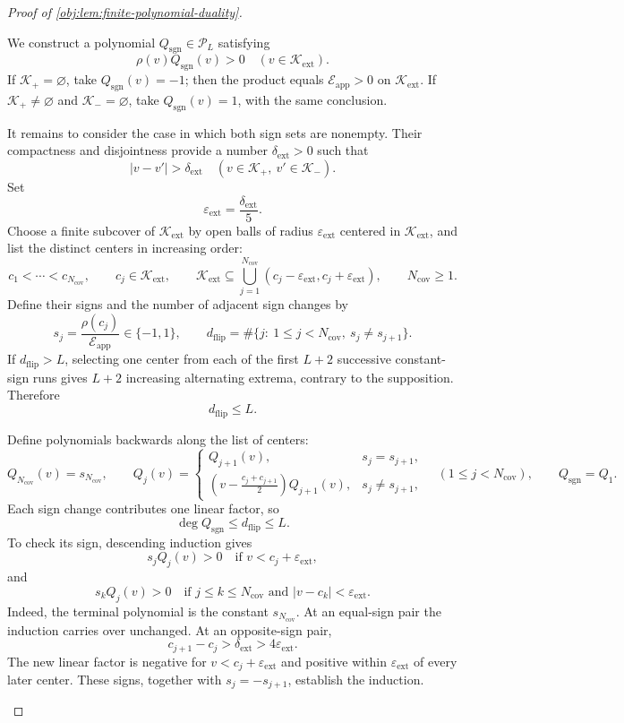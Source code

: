 \documentclass[11pt]{article}
\begin{document}
\begin{proof}[Proof of \cref{obj:lem:finite-polynomial-duality}]
\begin{enumerate}
We construct a polynomial \(Q_{\mathrm{sgn}}\in\mathscr P_L\) satisfying
\[
\rho(v)Q_{\mathrm{sgn}}(v)>0
\quad(v\in\mathcal K_{\mathrm{ext}}).
\]
If \(\mathcal K_+=\varnothing\), take \(Q_{\mathrm{sgn}}(v)=-1\); then the product equals \(\mathcal E_{\mathrm{app}}>0\) on \(\mathcal K_{\mathrm{ext}}\). If \(\mathcal K_+\ne\varnothing\) and \(\mathcal K_-=\varnothing\), take \(Q_{\mathrm{sgn}}(v)=1\), with the same conclusion.

It remains to consider the case in which both sign sets are nonempty. Their compactness and disjointness provide a number \(\delta_{\mathrm{ext}}>0\) such that
\[
|v-v'|>\delta_{\mathrm{ext}}
\quad(v\in\mathcal K_+,\ v'\in\mathcal K_-).
\]
Set
\[
\varepsilon_{\mathrm{ext}}=\frac{\delta_{\mathrm{ext}}}{5}.
\]
Choose a finite subcover of \(\mathcal K_{\mathrm{ext}}\) by open balls of radius \(\varepsilon_{\mathrm{ext}}\) centered in \(\mathcal K_{\mathrm{ext}}\), and list the distinct centers in increasing order:
\[
c_1<\cdots<c_{N_{\mathrm{cov}}},
\qquad
c_j\in\mathcal K_{\mathrm{ext}},
\qquad
\mathcal K_{\mathrm{ext}}
\subseteq
\bigcup_{j=1}^{N_{\mathrm{cov}}}
(c_j-\varepsilon_{\mathrm{ext}},c_j+\varepsilon_{\mathrm{ext}}),
\qquad
N_{\mathrm{cov}}\ge1.
\]
Define their signs and the number of adjacent sign changes by
\[
s_j=\frac{\rho(c_j)}{\mathcal E_{\mathrm{app}}}\in\{-1,1\},
\qquad
d_{\mathrm{flip}}
=
\#\{j:\ 1\le j<N_{\mathrm{cov}},\ s_j\ne s_{j+1}\}.
\]
If \(d_{\mathrm{flip}}>L\), selecting one center from each of the first \(L+2\) successive constant-sign runs gives \(L+2\) increasing alternating extrema, contrary to the supposition. Therefore
\[
d_{\mathrm{flip}}\le L.
\]

Define polynomials backwards along the list of centers:
\begingroup\footnotesize
\[
Q_{N_{\mathrm{cov}}}(v)=s_{N_{\mathrm{cov}}},
\qquad
Q_j(v)=
\begin{cases}
Q_{j+1}(v),&s_j=s_{j+1},\\[2mm]
\displaystyle
\left(v-\frac{c_j+c_{j+1}}2\right)Q_{j+1}(v),
&s_j\ne s_{j+1},
\end{cases}
\quad(1\le j<N_{\mathrm{cov}}),
\qquad
Q_{\mathrm{sgn}}=Q_1.
\]
\endgroup
Each sign change contributes one linear factor, so
\[
\deg Q_{\mathrm{sgn}}\le d_{\mathrm{flip}}\le L.
\]
To check its sign, descending induction gives
\[
s_jQ_j(v)>0
\quad\text{if }v<c_j+\varepsilon_{\mathrm{ext}},
\]
and
\[
s_kQ_j(v)>0
\quad\text{if }j\le k\le N_{\mathrm{cov}}
\text{ and }|v-c_k|<\varepsilon_{\mathrm{ext}}.
\]
Indeed, the terminal polynomial is the constant \(s_{N_{\mathrm{cov}}}\). At an equal-sign pair the induction carries over unchanged. At an opposite-sign pair,
\[
c_{j+1}-c_j>\delta_{\mathrm{ext}}>4\varepsilon_{\mathrm{ext}}.
\]
The new linear factor is negative for \(v<c_j+\varepsilon_{\mathrm{ext}}\) and positive within \(\varepsilon_{\mathrm{ext}}\) of every later center. These signs, together with \(s_j=-s_{j+1}\), establish the induction.


\end{enumerate}
\end{proof}
\end{document}
